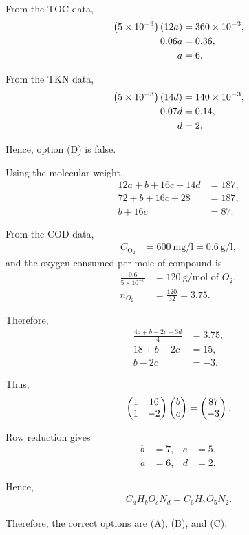 \begin{enumerate}[label=\thesubsection.\arabic*, ref=\thesubsection.\theenumi,itemsep=0pt]
From the TOC data,
\begin{align}
\left(5\times10^{-3}\right)\left(12a\right)&=360\times10^{-3},\\
0.06a&=0.36,\\
a&=6.
\end{align}

From the TKN data,
\begin{align}
\left(5\times10^{-3}\right)\left(14d\right)&=140\times10^{-3},\\
0.07d&=0.14,\\
d&=2.
\end{align}

Hence, option (D) is false.

Using the molecular weight,
\begin{align}
12a+b+16c+14d&=187,\\
72+b+16c+28&=187,\\
b+16c&=87.
\end{align}

From the COD data,
\begin{align}
C_{\mathrm{O_2}}
&=600\ \text{mg/l}=0.6\ \text{g/l},
\end{align}
and the oxygen consumed per mole of compound is
\begin{align}
\frac{0.6}{5\times10^{-3}}
&=120\ \text{g/mol of }O_2,\\
n_{O_2}
&=\frac{120}{32}=3.75.
\end{align}

Therefore,
\begin{align}
\frac{4a+b-2c-3d}{4}&=3.75,\\
18+b-2c&=15,\\
b-2c&=-3.
\end{align}

Thus,
\begin{align}
\begin{pmatrix}
1&16\\
1&-2
\end{pmatrix}
\begin{pmatrix}
b\\c
\end{pmatrix}
=
\begin{pmatrix}
87\\-3
\end{pmatrix}.
\end{align}

Row reduction gives
\begin{align}
b&=7, & c&=5,\\
a&=6, & d&=2.
\end{align}

Hence,
\begin{align}
C_aH_bO_cN_d=C_6H_7O_5N_2.
\end{align}

Therefore, the correct options are (A), (B), and (C).


\end{enumerate}
